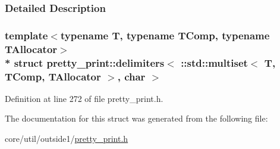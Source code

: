 \subsubsection{Detailed Description}
\subsubsection*{template$<$typename T, typename T\+Comp, typename T\+Allocator$>$\\*
struct pretty\+\_\+print\+::delimiters$<$ \+::std\+::multiset$<$ T, T\+Comp, T\+Allocator $>$, char $>$}



Definition at line 272 of file pretty\+\_\+print.\+h.



The documentation for this struct was generated from the following file\+:\begin{DoxyCompactItemize}
\item 
core/util/outside1/\hyperlink{pretty__print_8h}{pretty\+\_\+print.\+h}\end{DoxyCompactItemize}

